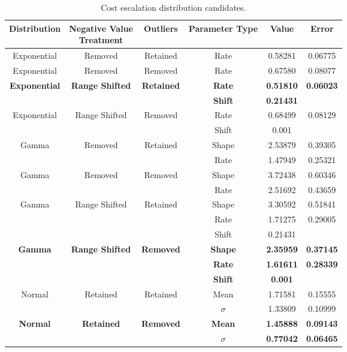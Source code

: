 \documentclass{article}
\begin{document}
\begin{adjustwidth}{-1cm}{-1cm}
\begin{center}
\begin{table}[!htbp]
\caption{Cost escalation distribution candidates.} \vspace{3 mm}
\begin{tabular} {| c | c | c | c | c | c |} \hline
  Distribution & \makecell{Negative Value \\ Treatment} & Outliers & Parameter Type & Value & Error \\  \hline
  Exponential & Removed & Retained & Rate & 0.58281 & 0.06775 \\ \hline
  Exponential & Removed & Removed & Rate & 0.67580 & 0.08077 \\ \hline
  \textbf{Exponential} & \textbf{Range Shifted} & \textbf{Retained} & \textbf{Rate} & \textbf{0.51810} & \textbf{0.06023} \\ \hline
   & & & \textbf{Shift} & \textbf{0.21431} & \\ \hline
  Exponential & Range Shifted & Removed & Rate & 0.68499 & 0.08129 \\ \hline
   & & & Shift & 0.001 & \\ \hline
  Gamma & Removed & Retained & Shape & 2.53879 & 0.39305 \\ \hline
   & & & Rate & 1.47949 & 0.25321 \\ \hline
  Gamma & Removed & Removed & Shape & 3.72438 & 0.60346 \\ \hline
   & & & Rate & 2.51692 & 0.43659 \\ \hline
  Gamma & Range Shifted & Retained & Shape & 3.30592 & 0.51841 \\ \hline
   & & & Rate & 1.71275 & 0.29005 \\ \hline
   & & & Shift & 0.21431 & \\ \hline
  \textbf{Gamma} & \textbf{Range Shifted} & \textbf{Removed} & \textbf{Shape} & \textbf{2.35959} & \textbf{0.37145} \\ \hline
   & & & \textbf{Rate} & \textbf{1.61611} & \textbf{0.28339} \\ \hline
   & & & \textbf{Shift} & \textbf{0.001} & \\ \hline
  Normal & Retained & Retained & Mean & 1.71581 & 0.15555 \\ \hline
   & & & $\sigma$ & 1.33809 & 0.10999 \\ \hline
  \textbf{Normal} & \textbf{Retained} & \textbf{Removed} & \textbf{Mean} & \textbf{1.45888} & \textbf{0.09143} \\ \hline
   & & & \textbf{$\sigma$} & \textbf{0.77042} & \textbf{0.06465} \\ \hline
\end{tabular}
\label{cesc}
\end{table}



\end{center}
\end{adjustwidth}
\end{document}
